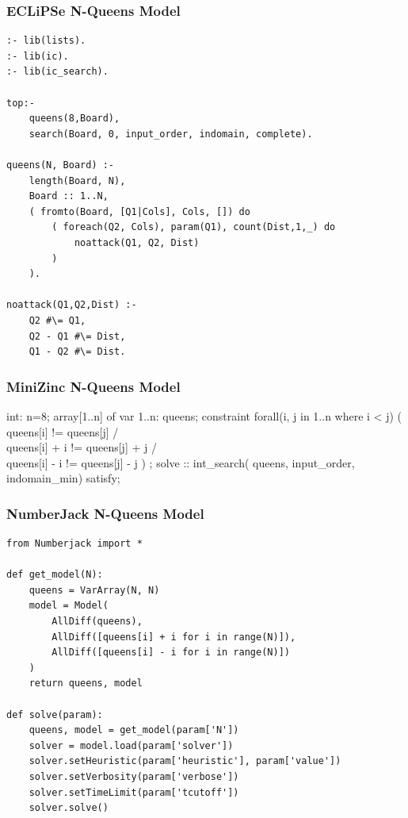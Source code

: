 \begin{frame}[fragile]
\frametitle{ECLiPSe N-Queens Model}
\label{nqueens:eclipse}
\tiny
\begin{verbatim}
:- lib(lists).
:- lib(ic).
:- lib(ic_search).

top:-
    queens(8,Board),
    search(Board, 0, input_order, indomain, complete).
    
queens(N, Board) :-
    length(Board, N),
    Board :: 1..N,
    ( fromto(Board, [Q1|Cols], Cols, []) do
        ( foreach(Q2, Cols), param(Q1), count(Dist,1,_) do
            noattack(Q1, Q2, Dist)
        )
    ).

noattack(Q1,Q2,Dist) :-
    Q2 #\= Q1,
    Q2 - Q1 #\= Dist,
    Q1 - Q2 #\= Dist.
\end{verbatim}
\hyperlink{nqueens:continue}{}
\end{frame}


\begin{frame}[fragile]
  \frametitle{MiniZinc N-Queens Model}
  \label{nqueens:minizinc}
  \tiny
  \begin{semiverbatim}
int: n=8;
array[1..n] of var 1..n: queens;
constraint
    forall(i, j in 1..n where i < j) (
         queens[i] != queens[j] /\\
         queens[i] + i != queens[j] + j /\\
         queens[i] - i != queens[j] - j
    )
 ;
solve :: int\_search(
        queens,
        input\_order,
        indomain\_min)
        satisfy;
  \end{semiverbatim}
\hyperlink{nqueens:continue}{}
\end{frame}

\begin{frame}[fragile]
\frametitle{NumberJack N-Queens Model}
\label{nqueens:numberjack}
\tiny
\begin{verbatim}
from Numberjack import *
 
def get_model(N):
    queens = VarArray(N, N)
    model = Model(
        AllDiff(queens),
        AllDiff([queens[i] + i for i in range(N)]),
        AllDiff([queens[i] - i for i in range(N)])
    )
    return queens, model
 
def solve(param):
    queens, model = get_model(param['N'])
    solver = model.load(param['solver'])
    solver.setHeuristic(param['heuristic'], param['value'])
    solver.setVerbosity(param['verbose'])
    solver.setTimeLimit(param['tcutoff'])
    solver.solve()
\end{verbatim}
\hyperlink{nqueens:continue}{}
\end{frame}

